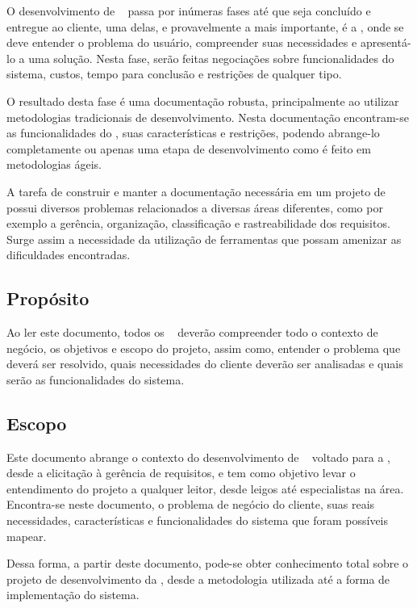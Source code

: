 
O desenvolvimento de \sw~ passa por inúmeras fases até que seja concluído e entregue ao cliente, uma delas, e provavelmente a mais importante, é a \er, onde se deve entender o problema do usuário, compreender suas necessidades e apresentá-lo a uma solução. Nesta fase, serão feitas negociações sobre funcionalidades do sistema, custos, tempo para conclusão e restrições de qualquer tipo.

O resultado desta fase é uma documentação robusta, principalmente ao utilizar metodologias tradicionais de desenvolvimento. Nesta documentação encontram-se as funcionalidades do \sw, suas características e restrições, podendo abrange-lo completamente ou apenas uma etapa de desenvolvimento como é feito em metodologias ágeis.

A tarefa de construir e manter a documentação necessária em um projeto de \sw~ possui diversos problemas relacionados a diversas áreas diferentes, como por exemplo a gerência, organização, classificação e rastreabilidade dos requisitos. Surge assim a necessidade da utilização de ferramentas que possam amenizar as dificuldades encontradas.

\subsection{Propósito}

Ao ler este documento, todos os \stakeholder~ deverão compreender todo o contexto de negócio, os objetivos e escopo do projeto, assim como, entender o problema que deverá ser resolvido, quais necessidades do cliente deverão ser analisadas e quais serão as funcionalidades do sistema.

\subsection{Escopo}

Este documento abrange o contexto do desenvolvimento de \sw~ voltado para a \er, desde a elicitação à gerência de requisitos, e tem como objetivo levar o entendimento do projeto a qualquer leitor, desde leigos até especialistas na área. Encontra-se neste documento, o problema de negócio do cliente, suas reais necessidades, características e funcionalidades do sistema que foram possíveis mapear.

Dessa forma, a partir deste documento, pode-se obter conhecimento total sobre o projeto de desenvolvimento da \nomeferramenta, desde a metodologia utilizada até a forma de implementação do sistema.

